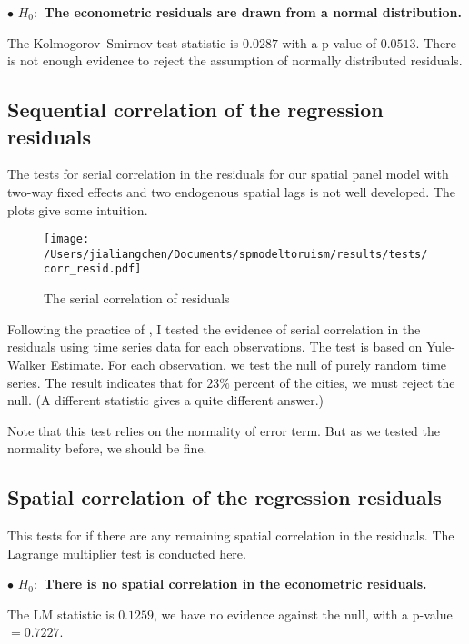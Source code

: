 \documentclass[11pt,a4paper]{amsart}
\theoremstyle{plain}
\theoremstyle{definition}
\begin{document}
$\bullet$ \textbf{$H_{0}:$ The econometric residuals are drawn from a normal distribution.} 

The Kolmogorov–Smirnov test statistic is  $0.0287$ with a p-value of $0.0513$. There is not enough evidence to reject the assumption of normally distributed residuals. 

\subsection{Sequential correlation of the regression residuals}\hfill\par

The tests for serial correlation in the residuals for our spatial panel model with two-way fixed effects and two endogenous spatial lags is not well developed. The plots give some intuition.

\begin{figure}[hbt]
	{\centering \texttt{[image: /Users/jialiangchen/Documents/spmodeltoruism/results/tests/corr\_resid.pdf]}}
	\caption{The serial correlation of residuals}\label{F:corr_resid}
\end{figure}

Following the practice of \parencite{elhorstEvidencePoliticalYardstick2009a}, I tested the evidence of serial correlation in the residuals using time series data for each observations. The test is based on Yule-Walker Estimate. For each observation, we test the null of purely random time series. The result indicates that for $23\%$ percent of the cities, we must reject the null.  (A different statistic gives a quite different answer.)

Note that this test relies on the normality of error term. But as we tested the normality before, we should be fine. 

\subsection{Spatial correlation of the regression residuals}\hfill\par

This tests for if there are any remaining spatial correlation in the residuals. The Lagrange multiplier test is conducted here.

$\bullet$ \textbf{$H_{0}:$ There is no spatial correlation in the econometric residuals.} 

The LM statistic is $0.1259$, we have no evidence against the null, with a p-value $= 0.7227$. 
\end{document}
